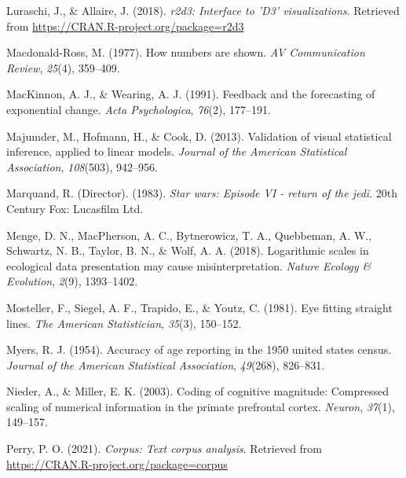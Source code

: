 \documentclass[print]{nuthesis}
\newlength{\cslhangindent}
\newenvironment{CSLReferences}[2]%
{\setlength{\parindent}{0pt}%
\everypar{\setlength{\hangindent}{\cslhangindent}}\ignorespaces}%
{\par}
\begin{document}
\begin{CSLReferences}{1}{0}
\leavevmode{}%
Luraschi, J., \& Allaire, J. (2018). \emph{r2d3: Interface to 'D3' visualizations}. Retrieved from \url{https://CRAN.R-project.org/package=r2d3}

\leavevmode{}%
Macdonald-Ross, M. (1977). How numbers are shown. \emph{AV Communication Review}, \emph{25}(4), 359--409.

\leavevmode{}%
MacKinnon, A. J., \& Wearing, A. J. (1991). Feedback and the forecasting of exponential change. \emph{Acta Psychologica}, \emph{76}(2), 177--191.

\leavevmode{}%
Majumder, M., Hofmann, H., \& Cook, D. (2013). Validation of visual statistical inference, applied to linear models. \emph{Journal of the American Statistical Association}, \emph{108}(503), 942--956.

\leavevmode{}%
Marquand, R. (Director). (1983). \emph{Star wars: Episode VI - return of the jedi}. 20th Century Fox: Lucasfilm Ltd.

\leavevmode{}%
Menge, D. N., MacPherson, A. C., Bytnerowicz, T. A., Quebbeman, A. W., Schwartz, N. B., Taylor, B. N., \& Wolf, A. A. (2018). Logarithmic scales in ecological data presentation may cause misinterpretation. \emph{Nature Ecology \& Evolution}, \emph{2}(9), 1393--1402.

\leavevmode{}%
Mosteller, F., Siegel, A. F., Trapido, E., \& Youtz, C. (1981). Eye fitting straight lines. \emph{The American Statistician}, \emph{35}(3), 150--152.

\leavevmode{}%
Myers, R. J. (1954). Accuracy of age reporting in the 1950 united states census. \emph{Journal of the American Statistical Association}, \emph{49}(268), 826--831.

\leavevmode{}%
Nieder, A., \& Miller, E. K. (2003). Coding of cognitive magnitude: Compressed scaling of numerical information in the primate prefrontal cortex. \emph{Neuron}, \emph{37}(1), 149--157.

\leavevmode{}%
Perry, P. O. (2021). \emph{Corpus: Text corpus analysis}. Retrieved from \url{https://CRAN.R-project.org/package=corpus}


\end{CSLReferences}
\end{document}
